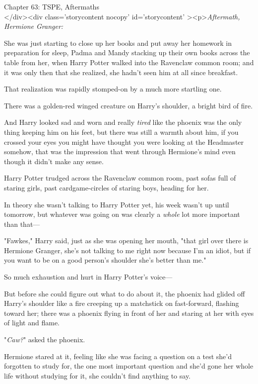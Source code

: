 
Chapter 63: TSPE, Aftermaths\\
</div><div  class='storycontent nocopy' id='storycontent' ><p>\emph{Aftermath, 
Hermione Granger:}

She was just starting to close up her books and put away her homework in 
preparation for sleep, Padma and Mandy stacking up their own books across the 
table from her, when Harry Potter walked into the Ravenclaw common room; and it 
was only then that she realized, she hadn't seen him at all since breakfast.

That realization was rapidly stomped-on by a much more startling one.

There was a golden-red winged creature on Harry's shoulder, a bright bird of 
fire.

And Harry looked sad and worn and really \emph{tired} like the phoenix was the 
only thing keeping him on his feet, but there was still a warmth about him, if 
you crossed your eyes you might have thought you were looking at the Headmaster 
somehow, that was the impression that went through Hermione's mind even though 
it didn't make any sense.

Harry Potter trudged across the Ravenclaw common room, past sofas full of 
staring girls, past cardgame-circles of staring boys, heading for her.

In theory she wasn't talking to Harry Potter yet, his week wasn't up until 
tomorrow, but whatever was going on was clearly a \emph{whole} lot more 
important than that---

"Fawkes," Harry said, just as she was opening her mouth, "that girl over there 
is Hermione Granger, she's not talking to me right now because I'm an idiot, 
but if you want to be on a good person's shoulder she's better than me."

So much exhaustion and hurt in Harry Potter's voice---

But before she could figure out what to do about it, the phoenix had glided off 
Harry's shoulder like a fire creeping up a matchstick on fast-forward, flashing 
toward her; there was a phoenix flying in front of her and staring at her with 
eyes of light and flame.

"\emph{Caw?}" asked the phoenix.

Hermione stared at it, feeling like she was facing a question on a test she'd 
forgotten to study for, the one most important question and she'd gone her 
whole life without studying for it, she couldn't find anything to say.

